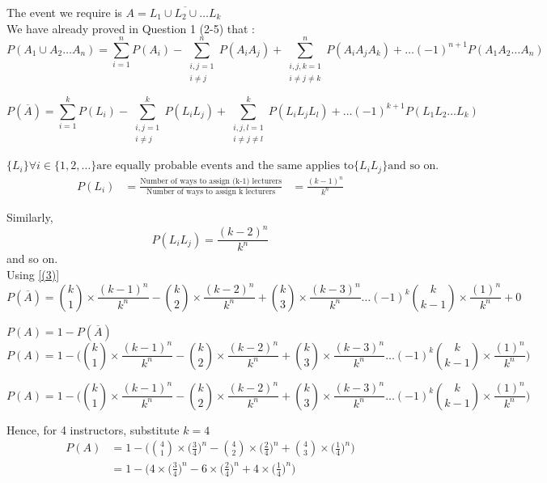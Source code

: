 \documentclass{article}
\begin{document}
The event we require is $A = \overline{L_1 \cup L_2 \cup \dots L_k}$ \\

We have already proved in Question 1 (2-5) that : \\
$$ P(A_1 \cup A_2 \dots A_n) = \sum_{i=1}^{n}P(A_i)  -  \sum_{\substack{i,j =1 \\ i \neq j}}^{n}P(A_i A_j)  +  \sum_{\substack{i,j,k = 1 \\ i \neq j \neq k}}^{n}P(A_i A_j A_k)  +  \dots   (-1)^{n+1}P(A_1 A_2 \dots A_n)$$

\begin{equation}
\label{(3)}
 P(\overline{A}) = \sum_{i=1}^{k}P(L_i)  -  \sum_{\substack{i,j =1 \\ i \neq j}}^{k}P(L_i L_j)  +  \sum_{\substack{i,j,l = 1 \\ i \neq j \neq l}}^{k}P(L_i L_j L_l)  +  \dots   (-1)^{k+1}P(L_1 L_2 \dots L_k)
\end{equation}

$\{L_i\} \forall   i \in \{1,2, \dots \} \text{are equally probable events and the same applies to} \{L_i L_j\} \text{and so on.}$ \\
\begin{align*}
P(L_i) &= \frac{\text{Number of ways to assign (k-1) lecturers}}{\text{Number of ways to assign k lecturers}}
 &= \frac{(k-1)^n}{k^n}
\end{align*}

Similarly,$$P(L_i L_j) = \frac{(k-2)^n}{k^n}$$
and so on. \\

Using \ref{(3)}
$$P(\overline{A}) = {k \choose 1} \times \frac{(k-1)^n}{k^n} - {k \choose 2} \times \frac{(k-2)^n}{k^n} + {k \choose 3} \times \frac{(k-3)^n}{k^n} \dots (-1)^k {k \choose k-1} \times \frac{(1)^n}{k^n} + 0$$

$ P(A) = 1 - P(\overline{A}) $ \\
$$ P(A) = 1 - \Bigg({k \choose 1} \times \frac{(k-1)^n}{k^n} - {k \choose 2} \times \frac{(k-2)^n}{k^n} + {k \choose 3} \times \frac{(k-3)^n}{k^n} \dots (-1)^k {k \choose k-1} \times \frac{(1)^n}{k^n} \Bigg)$$

$$ P(A) = 1 - \Bigg({k \choose 1} \times \frac{(k-1)^n}{k^n} - {k \choose 2} \times \frac{(k-2)^n}{k^n} + {k \choose 3} \times \frac{(k-3)^n}{k^n} \dots (-1)^k {k \choose k-1} \times \frac{(1)^n}{k^n} \Bigg)$$

Hence, for 4 instructors, substitute $ k = 4 $ \\
\begin{align*}
P(A) &= 1 - \Bigg({4 \choose 1} \times \bigg(\frac{3}{4}\bigg)^n - {4 \choose 2} \times \bigg(\frac{2}{4}\bigg)^n + {4 \choose 3} \times \bigg(\frac{1}{4}\bigg)^n \Bigg) \\
& = 1 - \Bigg(4 \times \bigg(\frac{3}{4}\bigg)^n - 6 \times \bigg(\frac{2}{4}\bigg)^n + 4 \times \bigg(\frac{1}{4}\bigg)^n \Bigg)
\end{align*}
\end{document}

